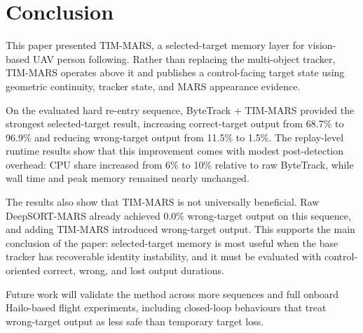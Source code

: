 \section{Conclusion}

This paper presented TIM-MARS, a selected-target memory layer for vision-based UAV person following. Rather than replacing the multi-object tracker, TIM-MARS operates above it and publishes a control-facing target state using geometric continuity, tracker state, and MARS appearance evidence.

On the evaluated hard re-entry sequence, ByteTrack + TIM-MARS provided the strongest selected-target result, increasing correct-target output from 68.7\% to 96.9\% and reducing wrong-target output from 11.5\% to 1.5\%. The replay-level runtime results show that this improvement comes with modest post-detection overhead: CPU share increased from 6\% to 10\% relative to raw ByteTrack, while wall time and peak memory remained nearly unchanged.

The results also show that TIM-MARS is not universally beneficial. Raw DeepSORT-MARS already achieved 0.0\% wrong-target output on this sequence, and adding TIM-MARS introduced wrong-target output. This supports the main conclusion of the paper: selected-target memory is most useful when the base tracker has recoverable identity instability, and it must be evaluated with control-oriented correct, wrong, and lost output durations.

Future work will validate the method across more sequences and full onboard Hailo-based flight experiments, including closed-loop behaviours that treat wrong-target output as less safe than temporary target loss.
